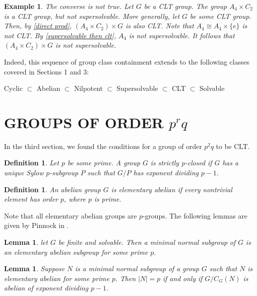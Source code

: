 \documentclass[12pt]{report}
\theoremstyle{newthm}
\newtheorem{Definition}[lem]{Definition}
\newtheorem{Example}[lem]{Example}
\newtheorem{Lemma}[lem]{Lemma}
\begin{document}
\begin{Example}
 The converse is not true. Let $G$ be a CLT group. The group $A_4\times C_2$ is a CLT group, but not supersolvable. More generally, let $G$ be some CLT group. Then, by \cref{direct prod}, $(A_4\times C_2)\times G$ is also CLT. Note that $A_4\cong A_4\times \{e\}$ is not CLT. By \cref{supersolvable then clt}, $A_4$ is not supersolvable. It follows that $(A_4\times C_2)\times G$ is not supersolvable.
\end{Example}
Indeed, this sequence of group class containment extends to the following classes covered in Sections 1 and 3:

\begin{center}
    Cyclic $\subset$ Abelian $\subset$ Nilpotent $\subset$ Supersolvable $\subset$ CLT $\subset$ Solvable
\end{center}
\newpage

\section{GROUPS OF ORDER $p^rq$}

In the third section, we found the conditions for a group of order $p^2q$ to be CLT.


\begin{Definition}
Let $p$ be some prime. A group $G$ is \textit{strictly p-closed} if $G$ has a unique Sylow $p$-subgroup $P$ such that $G/P$ has exponent dividing $p-1$.
\end{Definition}

\begin{Definition} An abelian group $G$ is \textit{elementary abelian} if every nontrivial element has order $p$, where $p$ is prime.
\end{Definition}

Note that all elementary abelian groups are $p$-groups. The following lemmas are given by Pinnock in \cite{Pinnock}.

\begin{Lemma}\label{min normal} let $G$ be finite and solvable. Then a minimal normal subgroup of $G$ is an elementary abelian subgroup for some prime $p$.
\end{Lemma}

\begin{Lemma}\label{abelian of exponent} Suppose $N$ is a minimal normal subgroup of a group $G$ such that $N$ is elementary abelian for some prime $p$. Then $|N|=p$ if and only if $G/C_G(N)$ is abelian of exponent dividing $p-1$.

\end{Lemma}
\end{document}
